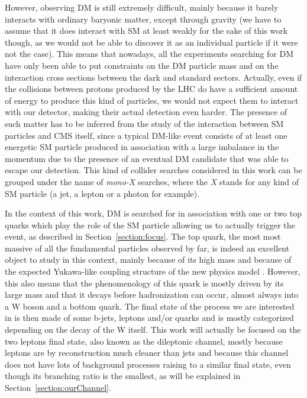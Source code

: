 \documentclass[a4paper, 10pt, openright]{report}
\begin{document}
However, observing \ac{DM} is still extremely difficult, mainly because it barely interacts with ordinary baryonic matter, except through gravity (we have to assume that it does interact with \ac{SM} at least weakly for the sake of this work though, as we would not be able to discover it as an individual particle if it were not the case). This means that nowadays, all the experiments searching for \ac{DM} have only been able to put constraints on the \ac{DM} particle mass and on the interaction cross sections between the dark and standard sectors. Actually, even if the collisions between protons produced by the LHC do have a sufficient amount of energy to produce this kind of particles, we would not expect them to interact with our detector, making their actual detection even harder. The presence of such matter has to be inferred from the study of the interaction between \ac{SM} particles and \ac{CMS} itself, since a typical \ac{DM}-like event consists of at least one energetic \ac{SM} particle produced in association with a large imbalance in the momentum due to the presence of an eventual \ac{DM} candidate that was able to escape our detection. This kind of collider searches considered in this work can be grouped under the name of \textit{mono-X} searches, where the \textit{X} stands for any kind of \ac{SM} particle (a jet, a lepton or a photon for example). 

In the context of this work, \ac{DM} is searched for in association with one or two top quarks which play the role of the \ac{SM} particle allowing us to actually trigger the event, as described in Section~\ref{section:focus}. The top quark, the most most massive of all the fundamental particles observed by far, is indeed an excellent object to study in this context, mainly because of its high mass and because of the expected Yukawa-like coupling structure of the new physics model \cite{MFVYukawa}. However, this also means that the phenomenology of this quark is mostly driven by its large mass and that it decays before hadronization can occur, almost always into a W boson and a bottom quark. The final state of the process we are interested in is then made of some b-jets, leptons and/or quarks and is mostly categorized depending on the decay of the W itself. This work will actually be focused on the two leptons final state, also known as the dileptonic channel, mostly because leptons are by reconstruction much cleaner than jets and because this channel does not have lots of background processes raising to a similar final state, even though its branching ratio is the smallest, as will be explained in Section~\ref{section:ourChannel}.
\end{document}
